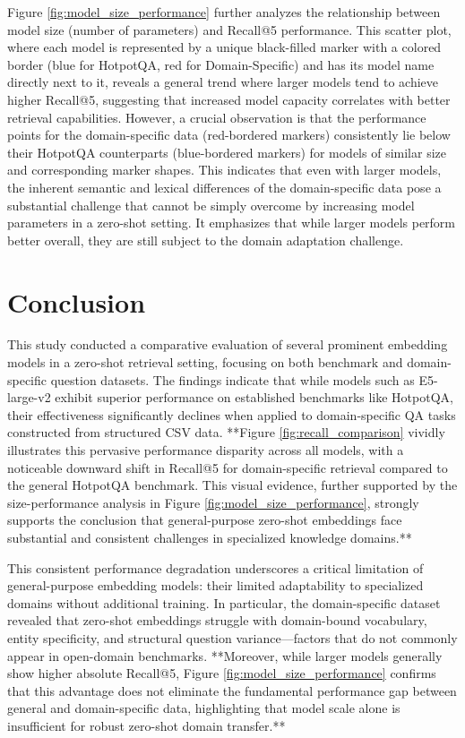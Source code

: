 \documentclass[11pt, a4paper]{article}
\begin{document}
Figure \ref{fig:model_size_performance} further analyzes the relationship between model size (number of parameters) and Recall@5 performance. This scatter plot, where each model is represented by a unique black-filled marker with a colored border (blue for HotpotQA, red for Domain-Specific) and has its model name directly next to it, reveals a general trend where larger models tend to achieve higher Recall@5, suggesting that increased model capacity correlates with better retrieval capabilities. However, a crucial observation is that the performance points for the domain-specific data (red-bordered markers) consistently lie below their HotpotQA counterparts (blue-bordered markers) for models of similar size and corresponding marker shapes. This indicates that even with larger models, the inherent semantic and lexical differences of the domain-specific data pose a substantial challenge that cannot be simply overcome by increasing model parameters in a zero-shot setting. It emphasizes that while larger models perform better overall, they are still subject to the domain adaptation challenge.

\section{Conclusion}
This study conducted a comparative evaluation of several prominent embedding models in a zero-shot retrieval setting, focusing on both benchmark and domain-specific question datasets. The findings indicate that while models such as E5-large-v2 exhibit superior performance on established benchmarks like HotpotQA, their effectiveness significantly declines when applied to domain-specific QA tasks constructed from structured CSV data. **Figure \ref{fig:recall_comparison} vividly illustrates this pervasive performance disparity across all models, with a noticeable downward shift in Recall@5 for domain-specific retrieval compared to the general HotpotQA benchmark. This visual evidence, further supported by the size-performance analysis in Figure \ref{fig:model_size_performance}, strongly supports the conclusion that general-purpose zero-shot embeddings face substantial and consistent challenges in specialized knowledge domains.**

This consistent performance degradation underscores a critical limitation of general-purpose embedding models: their limited adaptability to specialized domains without additional training. In particular, the domain-specific dataset revealed that zero-shot embeddings struggle with domain-bound vocabulary, entity specificity, and structural question variance—factors that do not commonly appear in open-domain benchmarks. **Moreover, while larger models generally show higher absolute Recall@5, Figure \ref{fig:model_size_performance} confirms that this advantage does not eliminate the fundamental performance gap between general and domain-specific data, highlighting that model scale alone is insufficient for robust zero-shot domain transfer.**
\end{document}
